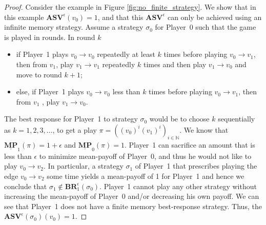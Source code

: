 \begin{proof}
Consider the example in Figure \ref{fig:no_finite_strategy}. We show that in this example $\mathbf{ASV}^{\epsilon}(v_0) = 1$, and that this $\mathbf{ASV}^{\epsilon}$ can only be achieved using an infinite memory strategy. Assume a strategy $\sigma_0$ for Player~0
such that the game is played in rounds.
In round $k$
\begin{itemize}[-]
    \item if Player~1 plays $v_0 \to v_0$ repeatedly at least $k$ times before playing $v_0 \to v_1$, then from $v_1$, play $v_1 \to v_1$ repeatedly $k$ times and then play $v_1 \to v_0$ and 
    move to round $k+1$;
    \item else, if Player~1 plays $v_0 \to v_0$ less than $k$ times before playing $v_0 \to v_1$, then from $v_1$ , play $v_1 \to v_0$.
\end{itemize}

The best response for Player~1 to strategy $\sigma_0$ would be to choose $k$ sequentially as $k = 1, 2, 3, \dotsc$, to get a play $\pi = ((v_0)^i(v_1)^i)_{i \in \mathbb{N}}$. We know that $\underline{\mathbf{MP}}_1(\pi) = 1+\epsilon$ and $\underline{\mathbf{MP}}_0(\pi) = 1$. Player~1 can sacrifice an amount that is less than $\epsilon$ to minimize mean-payoff of Player~0, and thus he would not like to play $v_0 \to v_2$. In particular, a strategy $\sigma_1$ of Player~1 that prescribes playing the edge $v_0 \to v_2$ some time 
yields a mean-payoff of 1 for Player~1 and hence we conclude that $\sigma_1 \notin \mathbf{BR}_1^{\epsilon}(\sigma_0)$. Player~1 cannot play any other strategy without increasing the mean-payoff of Player~0 and/or decreasing his own payoff.
We can see that Player~1 does not have a finite memory best-response strategy. Thus, the $\mathbf{ASV}^{\epsilon}(\sigma_0)(v_0) = 1$.


\end{proof}
